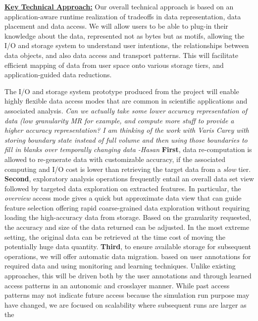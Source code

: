 \documentclass[11pt,letterpaper]{article}
\newcommand{\hasan}[1]{{\it \color{darkgreen} #1 -Hasan }}
\newcommand{\TODO}[1]{\textcolor{red}{ TO DO: #1 }}
\newcommand{\TODO}[1]{}
\newcommand{\hasan}[1]{}
\begin{document}
{%
% 


\underline{\textbf{Key Technical Approach:}}
Our overall technical approach is based on an application-aware runtime
realization of tradeoffs in data representation, data placement and data
access. We will allow users to be able to plug-in their knowledge 
about the data, represented not as bytes but as motifs, allowing the I/O and 
storage system to understand user
intentions, the relationships between data objects, and also data access
and transport patterns. This will facilitate efficient mapping of data from
user space onto various storage tiers, and application-guided
data reductions.

The I/O and storage system prototype produced from the project will enable
highly flexible data access modes that are common in scientific applications
and associated analysis.
%
\hasan{Can we actually take some lower accuracy representation of data (low
  granularity MR for example, and compute more stuff to provide a higher
  accuracy representation? I am thinking of the work with Varis Carey with
  storing boundary state instead of full volume and then using those
  boundaries to fill in blanks over temporally changing data}
%
\textbf{First}, data re-computation is allowed to re-generate data with
customizable accuracy, if the associated computing and I/O cost is lower
than retrieving the target data from a {\em slow} tier.
%
\textbf{Second}, exploratory analysis operations frequently entail an
overall data set view followed by targeted data exploration on extracted
features.  In particular, the {\em overview} access mode gives a quick but
approximate data view that can guide feature selection offering rapid
coarse-grained data exploration without requiring loading the high-accuracy
data from storage. Based on the granularity requested, the accuracy and size
of the data returned can be adjusted. In the most extreme setting, the
original data can be retrieved at the time cost of moving the potentially
huge data quantity.
%
\textbf{Third}, to ensure available storage for subsequent operations, we
will offer automatic data migration. based on user annotations for required data and using monitoring and learning techniques.  Unlike existing approaches, this will be
driven both by the user annotations and through learned access patterns in
an autonomic and crosslayer manner.  While past access patterns may not
indicate future access because the simulation run purpose may have changed,
we are focused on scalability where subsequent runs are larger as the
}
\end{document}
